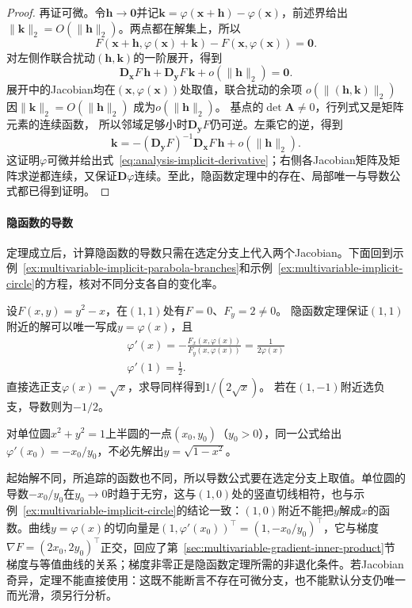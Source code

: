 \begin{proof}
再证可微。令$\bm{h}\to\bm{0}$并记$\bm{k}=\varphi(\bm{x}+\bm{h})-\varphi(\bm{x})$，前述界给出$\lVert\bm{k}\rVert_2=O(\lVert\bm{h}\rVert_2)$。两点都在解集上，所以
\[
 F(\bm{x}+\bm{h},\varphi(\bm{x})+\bm{k})-F(\bm{x},\varphi(\bm{x}))=\bm{0}.
\]
对左侧作联合扰动$(\bm h,\bm k)$的一阶展开，得到
\[
 \bm{D}_{\bm{x}}F\,\bm{h}+\bm{D}_{\bm{y}}F\,\bm{k}+o(\lVert\bm{h}\rVert_2)=\bm{0}.
\]
展开中的Jacobian均在$(\bm x,\varphi(\bm x))$处取值，联合扰动的余项
$o(\lVert(\bm h,\bm k)\rVert_2)$因$\lVert\bm k\rVert_2=O(\lVert\bm h\rVert_2)$
成为$o(\lVert\bm h\rVert_2)$。
基点的$\det\bm A\neq0$，行列式又是矩阵元素的连续函数，
所以邻域足够小时$\bm D_{\bm y}F$仍可逆。左乘它的逆，得到
\[
 \bm{k}=-(\bm{D}_{\bm{y}}F)^{-1}\bm{D}_{\bm{x}}F\,\bm{h}+o(\lVert\bm{h}\rVert_2).
\]
这证明$\varphi$可微并给出式~\eqref{eq:analysis-implicit-derivative}；右侧各Jacobian矩阵及矩阵求逆都连续，又保证$\bm{D}\varphi$连续。至此，隐函数定理中的存在、局部唯一与导数公式都已得到证明。
\end{proof}

\paragraph{隐函数的导数}

定理成立后，计算隐函数的导数只需在选定分支上代入两个Jacobian。下面回到示例~\ref{ex:multivariable-implicit-parabola-branches}和示例~\ref{ex:multivariable-implicit-circle}的方程，核对不同分支各自的变化率。

\begin{example}[隐函数分支的导数]
\label{ex:multivariable-implicit-branch-derivative}
设$F(x,y)=y^2-x$，在$(1,1)$处有$F=0$、$F_y=2\neq0$。
隐函数定理保证$(1,1)$附近的解可以唯一写成$y=\varphi(x)$，且
\[
 \begin{gathered}
\varphi'(x)=-\frac{F_x(x,\varphi(x))}{F_y(x,\varphi(x))}
 =\frac1{2\varphi(x)}\\
\varphi'(1)=\frac12.
 \end{gathered}
\]
直接选正支$\varphi(x)=\sqrt x$，求导同样得到$1/(2\sqrt x)$。
若在$(1,-1)$附近选负支，导数则为$-1/2$。

对单位圆$x^2+y^2=1$上半圆的一点$(x_0,y_0)$（$y_0>0$），同一公式给出$\varphi'(x_0)=-x_0/y_0$，不必先解出$y=\sqrt{1-x^2}$。
\end{example}

起始解不同，所追踪的函数也不同，所以导数公式要在选定分支上取值。单位圆的导数$-x_0/y_0$在$y_0\to0$时趋于无穷，这与$(1,0)$处的竖直切线相符，也与示例~\ref{ex:multivariable-implicit-circle}的结论一致：$(1,0)$附近不能把$y$解成$x$的函数。曲线$y=\varphi(x)$的切向量是$(1,\varphi'(x_0))^\top=(1,-x_0/y_0)^\top$，它与梯度$\nabla F=(2x_0,2y_0)^\top$正交，回应了第~\ref{sec:multivariable-gradient-inner-product}节梯度与等值曲线的关系；梯度非零正是隐函数定理所需的非退化条件。若Jacobian奇异，定理不能直接使用：这既不能断言不存在可微分支，也不能默认分支仍唯一而光滑，须另行分析。

